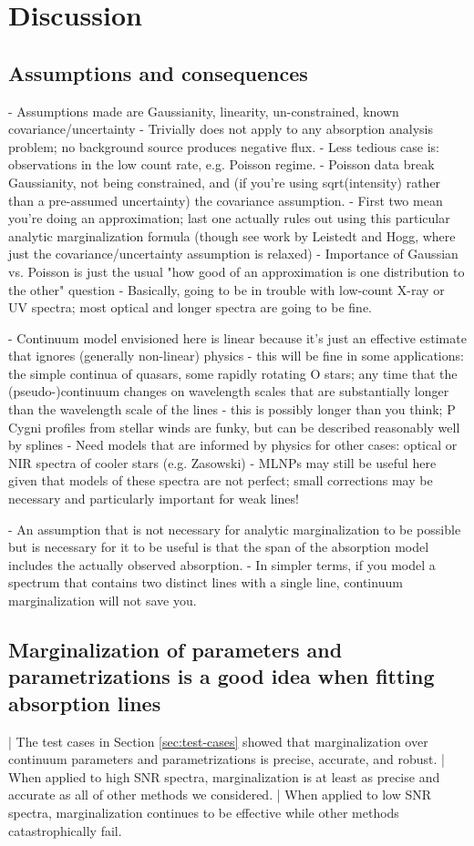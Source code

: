 \documentclass[manuscript]{aastex62}
\begin{document}
\section{Discussion}
\label{sec:discussion}
\subsection{Assumptions and consequences}
- Assumptions made are Gaussianity, linearity, un-constrained, known covariance/uncertainty
- Trivially does not apply to any absorption analysis problem; no background source produces negative flux.
- Less tedious case is: observations in the low count rate, e.g. Poisson regime.
- Poisson data break Gaussianity, not being constrained, and (if you're using sqrt(intensity) rather than a pre-assumed uncertainty) the covariance assumption.
- First two mean you're doing an approximation; last one actually rules out using this particular analytic marginalization formula (though see work by Leistedt and Hogg, where just the covariance/uncertainty assumption is relaxed)
- Importance of Gaussian vs. Poisson is just the usual "how good of an approximation is one distribution to the other" question
- Basically, going to be in trouble with low-count X-ray or UV spectra; most optical and longer spectra are going to be fine.

- Continuum model envisioned here is linear because it's just an effective estimate that ignores (generally non-linear) physics
- this will be fine in some applications: the simple continua of quasars, some rapidly rotating O stars; any time that the (pseudo-)continuum changes on wavelength scales that are substantially longer than the wavelength scale of the lines
- this is possibly longer than you think; P Cygni profiles from stellar winds are funky, but can be described reasonably well by splines
- Need models that are informed by physics for other cases: optical or NIR spectra of cooler stars (e.g. Zasowski)
- MLNPs may still be useful here given that models of these spectra are not perfect; small corrections may be necessary and particularly important for weak lines!

- An assumption that is not necessary for analytic marginalization to be possible but is necessary for it to be useful is that the span of the absorption model includes the actually observed absorption.
- In simpler terms, if you model a spectrum that contains two distinct lines with a single line, continuum marginalization will not save you.

\subsection{Marginalization of parameters and parametrizations is a good idea when fitting absorption lines}
| The test cases in Section \ref{sec:test-cases} showed that marginalization over continuum parameters and parametrizations is precise, accurate, and robust.
| When applied to high SNR spectra, marginalization is at least as precise and accurate as all of other methods we considered.
| When applied to low SNR spectra, marginalization continues to be effective while other methods catastrophically fail.
\end{document}
